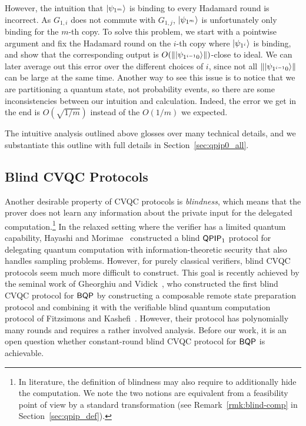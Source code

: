 However, the intuition that $\ket{\psi_{1^m}}$ is binding to every Hadamard round is incorrect. As $G_{1,i}$ does not commute with $G_{1,j}$, $\ket{\psi_{1^m}}$ is unfortunately only binding for the $m$-th copy.
To solve this problem, we start with a pointwise argument and fix the Hadamard round on the $i$-th copy where $\ket{\psi_{1^i}}$ is binding,
and show that the corresponding output is $O(\left\lVert\ket{\psi_{1^{i-1}0}}\right\rVert)$-close to ideal.
We can later average out this error over the different choices of $i$, since not all $\left\lVert\ket{\psi_{1^{i-1}0}}\right\rVert$ can be large at the same time. Another way to see this issue is to notice that we are partitioning a quantum state, not probability events, so there are some inconsistencies between our intuition and calculation. Indeed, the error we get in the end is $O(\sqrt{1/m})$ instead of the $O(1/m)$ we expected. 

The intuitive analysis outlined above glosses over many technical details, and we substantiate this outline with full details in 
Section~\ref{sec:qpip0_all}.

\subsection{Blind CVQC Protocols} \label{subsection:blind}



Another desirable property of CVQC protocols is  \emph{blindness}, which means that the prover does not learn any information about the private input for the delegated computation.\footnote{In literature, the definition of blindness may also require to additionally hide the computation. We note the two notions are equivalent from a feasibility point of view by a standard transformation (see Remark~\ref{rmk:blind-comp} in Section~\ref{sec:qpip_def}). 
} In the relaxed setting where the verifier has a limited quantum capability, Hayashi and Morimae~\cite{hayashi2015verifiable} constructed a blind $\operatorname{\mathsf{QPIP}}_1$ protocol for delegating quantum computation with information-theoretic security that also handles sampling problems. 
However, for purely classical verifiers, blind CVQC protocols seem much more difficult to construct. This goal is recently achieved by the seminal work of Gheorghiu and Vidick~\cite{FOCS:GheVid19}, who constructed the first blind CVQC protocol for $\operatorname{\mathsf{BQP}}$ by constructing a composable remote state preparation protocol and combining it with the verifiable blind quantum computation protocol of Fitzsimons and Kashefi~\cite{FK17}. However, their protocol has   polynomially many rounds  and requires a rather involved analysis. Before our work, it is an open question whether constant-round blind CVQC protocol for $\operatorname{\mathsf{BQP}}$ is achievable.

